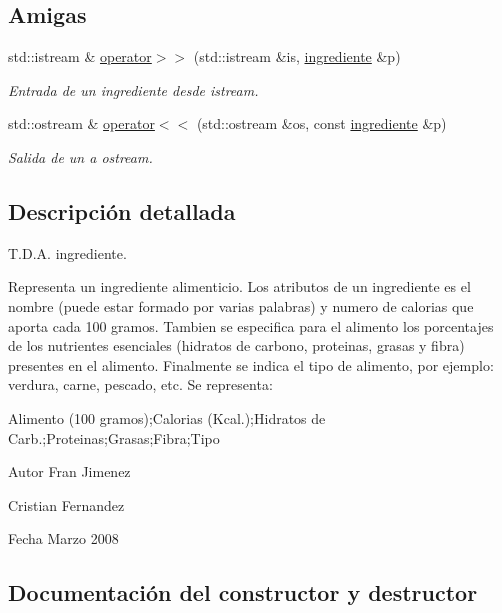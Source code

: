 \subsection*{Amigas}
\begin{DoxyCompactItemize}
\item 
std\+::istream \& \hyperlink{classingrediente_a934ac4c1bed7330ab27297cf27b994df}{operator$>$$>$} (std\+::istream \&is, \hyperlink{classingrediente}{ingrediente} \&p)
\begin{DoxyCompactList}\small\item\em Entrada de un ingrediente desde istream. \end{DoxyCompactList}\item 
std\+::ostream \& \hyperlink{classingrediente_ae7d30d9b20aead90a4d3b11a4ff57e21}{operator$<$$<$} (std\+::ostream \&os, const \hyperlink{classingrediente}{ingrediente} \&p)
\begin{DoxyCompactList}\small\item\em Salida de un a ostream. \end{DoxyCompactList}\end{DoxyCompactItemize}


\subsection{Descripción detallada}
T.\+D.\+A. ingrediente. 

Representa un ingrediente alimenticio. Los atributos de un ingrediente es el nombre (puede estar formado por varias palabras) y numero de calori­as que aporta cada 100 gramos. Tambien se especifica para el alimento los porcentajes de los nutrientes esenciales (hidratos de carbono, protei­nas, grasas y fibra) presentes en el alimento. Finalmente se indica el tipo de alimento, por ejemplo\+: verdura, carne, pescado, etc. Se representa\+:

Alimento (100 gramos);Calorias (Kcal.);Hidratos de Carb.;Proteinas;Grasas;Fibra;Tipo

\begin{DoxyAuthor}{Autor}
Fran Jimenez 

Cristian Fernandez 
\end{DoxyAuthor}
\begin{DoxyDate}{Fecha}
Marzo 2008 
\end{DoxyDate}


\subsection{Documentación del constructor y destructor}
\mbox{\label{classingrediente_a4f2c8e16106eb4cf5a8ad9695d7a3809}} 
